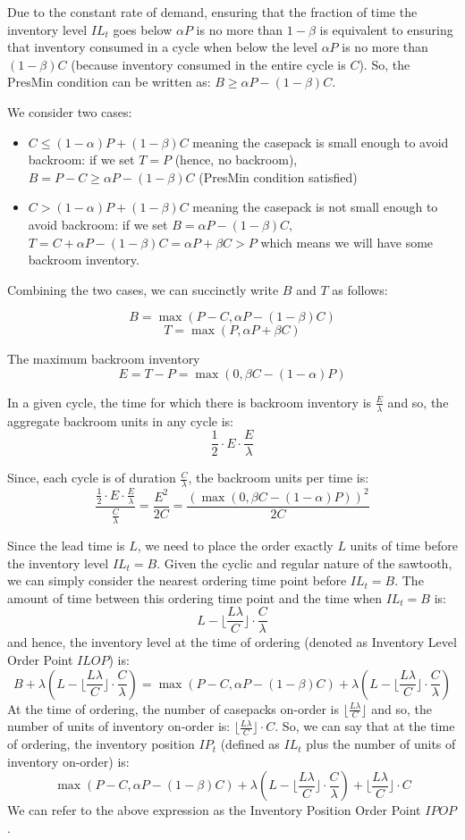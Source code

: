 \documentclass[12pt]{amsart}
\begin{document}
Due to the constant rate of demand, ensuring that the fraction of time the inventory level $IL_t$ goes below $\alpha P$ is no more than $1-\beta$ is equivalent to ensuring that inventory consumed in a cycle when below the level $\alpha P$ is no more than $(1-\beta)C$ (because inventory consumed in the entire cycle is $C$). So, the PresMin condition can be written as: $B \geq \alpha P - (1-\beta)C$.

We consider two cases:
\begin{itemize}
\item $C \leq (1-\alpha)P + (1-\beta)C$ meaning the casepack is small enough to avoid backroom: if we set $T = P$ (hence, no backroom), $B = P - C \geq \alpha P - (1-\beta)C$ (PresMin condition satisfied)
\item $C > (1-\alpha)P + (1-\beta)C$ meaning the casepack is not small enough to avoid backroom: if we set $B =  \alpha P - (1-\beta)C$, $T = C + \alpha P - (1- \beta)C = \alpha P + \beta C > P$ which means we will have some backroom inventory.
\end{itemize}

Combining the two cases, we can succinctly write $B$ and $T$ as follows:

$$B = \max(P - C, \alpha P - (1-\beta)C)$$
$$T = \max(P, \alpha P + \beta C)$$

The maximum backroom inventory
$$E =T - P = \max(0, \beta C  - (1-\alpha)P)$$

In a given cycle, the time for which there is backroom inventory is $\frac E \lambda$ and so, the aggregate backroom units in any cycle is: $$\frac 1 2 \cdot E \cdot \frac E \lambda$$

Since, each cycle is of duration $\frac C \lambda$, the backroom units per time is:
$$\frac {\frac 1 2 \cdot E \cdot \frac E \lambda} {\frac C \lambda} = \frac {E^2} {2C} = \frac {(\max(0, \beta C  - (1-\alpha)P))^2} {2C}$$

Since the lead time is $L$, we need to place the order exactly $L$ units of time before the inventory level $IL_t = B$. Given the cyclic and regular nature of the sawtooth, we can simply consider the nearest ordering time point before $IL_t = B$. The amount of time between this ordering time point and the time when $IL_t = B$ is:
$$L - \lfloor \frac {L \lambda} C \rfloor \cdot \frac C \lambda$$
and hence, the inventory level at the time of ordering (denoted as Inventory Level Order Point $ILOP$) is:
$$B + \lambda (L - \lfloor \frac {L \lambda} C \rfloor \cdot \frac C \lambda) = \max(P - C, \alpha P - (1- \beta)C) + \lambda (L - \lfloor \frac {L \lambda} C \rfloor \cdot \frac C \lambda)$$
At the time of ordering, the number of casepacks on-order is $\lfloor \frac {L \lambda} C \rfloor$ and so, the number of units of inventory on-order is: $\lfloor \frac {L \lambda} C \rfloor \cdot C$.
So, we can say that at the time of ordering, the inventory position $IP_t$ (defined as $IL_t$ plus the number of units of inventory on-order) is: $$\max(P - C, \alpha P - (1- \beta)C) + \lambda (L - \lfloor \frac {L \lambda} C \rfloor \cdot \frac C \lambda) + \lfloor \frac {L \lambda} C \rfloor \cdot C$$
We can refer to the above expression as the Inventory Position Order Point $IPOP$.
\end{document}
